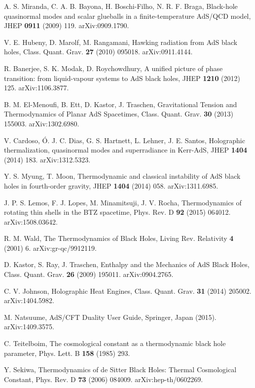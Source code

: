 \documentclass[prd,onecolumn,notitlepage,amsmath,nofootinbib,superscriptaddress,showpacs,showkeys]{revtex4-1}
\begin{document}
\begin{thebibliography}{99}
A. S. Miranda, C. A. B. Bayona, H. Boschi-Filho,
N. R. F. Braga, Black-hole quasinormal modes and scalar glueballs
in a finite-temperature AdS/QCD model, JHEP \textbf{0911} (2009) 119.
arXiv:0909.1790.

V. E. Hubeny, D. Marolf, M. Rangamani, Hawking radiation
from AdS black holes, Class. Quant. Grav. \textbf{27} (2010) 095018.
arXiv:0911.4144.

R. Banerjee, S. K. Modak, D. Roychowdhury, A unified
picture of phase transition: from liquid-vapour systems to AdS black
holes, JHEP \textbf{1210} (2012) 125. arXiv:1106.3877.

B. M. El-Menoufi, B. Ett, D. Kastor, J. Traschen,
Gravitational Tension and Thermodynamics of Planar AdS Spacetimes,
Class. Quant. Grav. \textbf{30} (2013) 155003. arXiv:1302.6980.

V. Cardoso, \'{O}. J. C. Dias, G. S. Hartnett, L. Lehner,
J. E. Santos, Holographic thermalization, quasinormal modes and superradiance
in Kerr-AdS, JHEP \textbf{1404} (2014) 183. arXiv:1312.5323.

Y. S. Myung, T. Moon, Thermodynamic and classical
instability of AdS black holes in fourth-order gravity, JHEP \textbf{1404}
(2014) 058. arXiv:1311.6985.

J. P. S. Lemos, F. J. Lopes, M. Minamitsuji, J. V.
Rocha, Thermodynamics of rotating thin shells in the BTZ spacetime,
Phys. Rev. D \textbf{92} (2015) 064012. arXiv:1508.03642.

R. M. Wald, The Thermodynamics of Black Holes, Living
Rev. Relativity \textbf{4} (2001) 6. arXiv:gr-qc/9912119.

D. Kastor, S. Ray, J. Traschen, Enthalpy and
the Mechanics of AdS Black Holes, Class. Quant. Grav. \textbf{26}
(2009) 195011. arXiv:0904.2765.

C. V. Johnson, Holographic Heat Engines, Class. Quant.
Grav. \textbf{31} (2014) 205002. arXiv:1404.5982.

M. Natsuume, AdS/CFT Duality User Guide, Springer,
Japan (2015). arXiv:1409.3575.

C. Teitelboim, The cosmological constant as a thermodynamic
black hole parameter, Phys. Lett. B \textbf{158} (1985) 293.

Y. Sekiwa, Thermodynamics of de Sitter Black Holes:
Thermal Cosmological Constant, Phys. Rev. D \textbf{73} (2006) 084009.
arXiv:hep-th/0602269.


\end{thebibliography}
\end{document}
